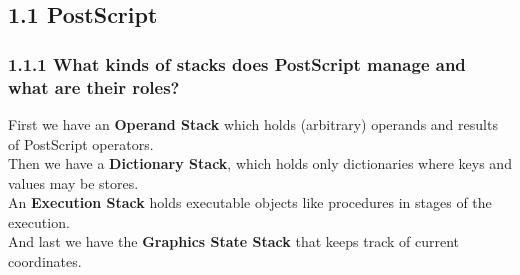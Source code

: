 \documentclass{article}
\begin{document}
	\pagestyle{fancy}
	\hfill
	
	\subsection*{1.1 PostScript}
	\begin{adjustwidth}{2em}{2em}
		\subsubsection*{1.1.1 What kinds of stacks does PostScript manage and what are their roles?}
		\begin{adjustwidth}{2em}{}
			First we have an \textbf{Operand Stack} which holds (arbitrary) operands and results of PostScript operators. \\
			Then we have a \textbf{Dictionary Stack}, which holds only dictionaries where keys and values may be stores. \\
			An \textbf{Execution Stack} holds executable objects like procedures in stages of the execution. \\
			And last we have the \textbf{Graphics State Stack} that keeps track of current coordinates.
		\end{adjustwidth}

\end{adjustwidth}
\end{document}
